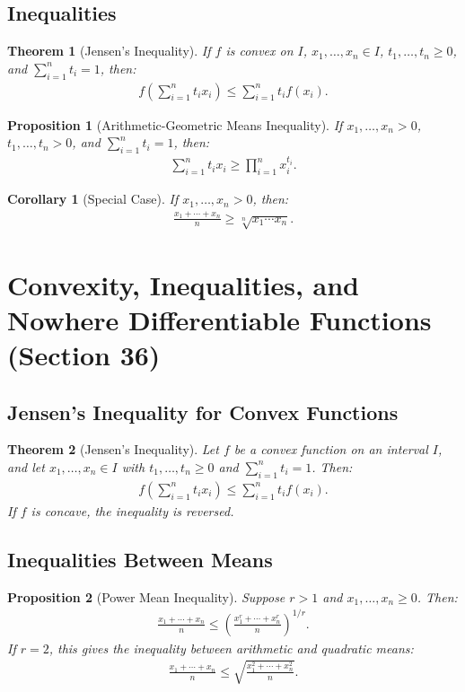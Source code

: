 \documentclass[9pt]{article}
\theoremstyle{definition}
\theoremstyle{plain}
\newtheorem{theorem}{Theorem}
\newtheorem{proposition}{Proposition}
\newtheorem{corollary}{Corollary}
\begin{document}
\subsection*{Inequalities}
\begin{theorem}[Jensen’s Inequality]
If $ f $ is convex on $ I $, $ x_1, \ldots, x_n \in I $, $ t_1, \ldots, t_n \geq 0 $, and $ \sum_{i=1}^n t_i = 1 $, then:
\begin{align}
f\left(\sum_{i=1}^n t_i x_i\right) \leq \sum_{i=1}^n t_i f(x_i).
\end{align}
\end{theorem}

\begin{proposition}[Arithmetic-Geometric Means Inequality]
If $ x_1, \ldots, x_n > 0 $, $ t_1, \ldots, t_n > 0 $, and $ \sum_{i=1}^n t_i = 1 $, then:
\begin{align}
\sum_{i=1}^n t_i x_i \geq \prod_{i=1}^n x_i^{t_i}.
\end{align}
\end{proposition}

\begin{corollary}[Special Case]
If $ x_1, \ldots, x_n > 0 $, then:
\begin{align}
\frac{x_1 + \cdots + x_n}{n} \geq \sqrt[n]{x_1 \cdots x_n}.
\end{align}
\end{corollary}
\section*{Convexity, Inequalities, and Nowhere Differentiable Functions (Section 36)}

\subsection*{Jensen’s Inequality for Convex Functions}
\begin{theorem}[Jensen’s Inequality]
Let $ f $ be a convex function on an interval $ I $, and let $ x_1, \ldots, x_n \in I $ with $ t_1, \ldots, t_n \geq 0 $ and $ \sum_{i=1}^n t_i = 1 $. Then:
\begin{align}
f\left(\sum_{i=1}^n t_i x_i\right) \leq \sum_{i=1}^n t_i f(x_i).
\end{align}
If $ f $ is concave, the inequality is reversed.
\end{theorem}

\subsection*{Inequalities Between Means}
\begin{proposition}[Power Mean Inequality]
Suppose $ r > 1 $ and $ x_1, \ldots, x_n \geq 0 $. Then:
\begin{align}
\frac{x_1 + \cdots + x_n}{n} \leq \left(\frac{x_1^r + \cdots + x_n^r}{n}\right)^{1/r}.
\end{align}
If $ r = 2 $, this gives the inequality between arithmetic and quadratic means:
\begin{align}
\frac{x_1 + \cdots + x_n}{n} \leq \sqrt{\frac{x_1^2 + \cdots + x_n^2}{n}}.
\end{align}
\end{proposition}
\end{document}
